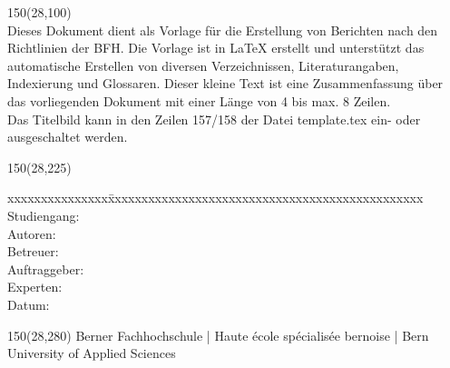 \begin{titlepage}
\begin{flushleft}
\begin{textblock}{150}(28,100)
\fontsize{10pt}{12pt} \\ 
Dieses Dokument dient als Vorlage für die Erstellung von Berichten nach den Richtlinien der BFH. Die Vorlage ist in \LaTeX{} erstellt und unterstützt das automatische Erstellen von diversen Verzeichnissen, Literaturangaben, Indexierung und Glossaren. Dieser kleine Text ist eine Zusammenfassung über das vorliegenden Dokument mit einer Länge von 4 bis max. 8 Zeilen. \\
Das Titelbild kann in den Zeilen 157/158 der Datei template.tex ein- oder ausgeschaltet werden.
\end{textblock}

\begin{textblock}{150}(28,225)
\fontsize{10pt}{17pt}\selectfont
\begin{tabbing}
xxxxxxxxxxxxxxx\=xxxxxxxxxxxxxxxxxxxxxxxxxxxxxxxxxxxxxxxxxxxxxxx \kill
Studiengang:		\\			%
Autoren:				\\					%
Betreuer:			\\					%
Auftraggeber:	\> [Wwwww AG]						\\					%
Experten:						\\					%
Datum:			\> \versiondate					\\		%
\end{tabbing}

\end{textblock}
\end{flushleft}

\begin{textblock}{150}(28,280)
\noindent 
\color{bfhgrey}\fontsize{9pt}{10pt}\selectfont
Berner Fachhochschule | Haute école spécialisée bernoise | Bern University of Applied Sciences
\color{black}\selectfont
\end{textblock}


\end{titlepage}

%
%
